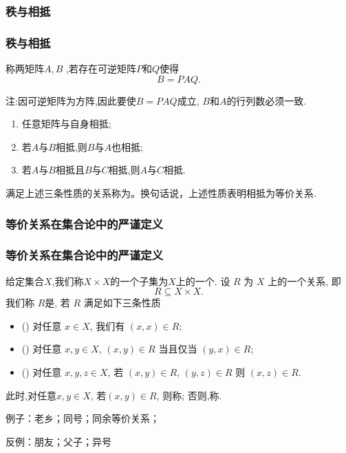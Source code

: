 \subsubsection{秩与相抵}
\begin{frame}\frametitle{秩与相抵}
\begin{definition}[相抵] 称两矩阵$A,B$ ,若存在可逆矩阵$P$和$Q$使得
\[B=PAQ.\]
\end{definition}
\pp
注:因可逆矩阵为方阵,因此要使$B=PAQ$成立, $B$和$A$的行列数必须一致.
\pp

\begin{proposition}[相抵的基本性质]
\begin{enumerate}
\item  任意矩阵与自身相抵; \pp
\item  若$A$与$B$相抵,则$B$与$A$也相抵; \pp
\item  若$A$与$B$相抵且$B$与$C$相抵,则$A$与$C$相抵.
\end{enumerate}
\end{proposition}
满足上述三条性质的关系称为。换句话说，上述性质表明相抵为等价关系.
\end{frame}





\subsubsection{等价关系在集合论中的严谨定义}
\begin{frame}\frametitle{等价关系在集合论中的严谨定义}
\begin{definition}[等价关系严谨定义]
给定集合$X$,我们称$X\times X$的一个子集为$X$上的一个. \pp 设 $R$ 为 $X$ 上的一个关系, 即
\[R\subseteq X\times X.\] \pp
我们称 $R$是, 若 $R$ 满足如下三条性质
\begin{itemize}
\item () 对任意 $x\in X$, 我们有 $(x,x)\in R$;
\item () 对任意 $x,y\in X$, $(x,y)\in R$ 当且仅当 $(y,x)\in R$;
\item () 对任意 $x,y,z\in X$, 若 $(x,y)\in R$, $(y,z)\in R$ 则 $(x,z)\in R$.
\end{itemize}
\pp
此时,对任意$x,y\in X$, 若$(x,y)\in R$, 则称; 否则,称.
\end{definition}

\begin{example}
例子：老乡；同号；同余等价关系；

反例：朋友；父子；异号
\end{example}

\end{frame}




